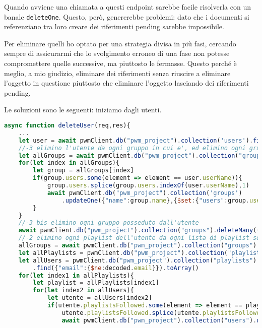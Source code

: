 Quando avviene una chiamata a questi endpoint sarebbe facile risolverla con un banale \verb|deleteOne|. Questo, però, genererebbe problemi: dato che i documenti si referenziano tra loro creare dei riferimenti pending sarebbe impossibile.

Per eliminare quelli ho optato per una strategia divisa in più fasi, cercando sempre di assicurarmi che lo svolgimento erroneo di una fase non potesse compromettere quelle successive, ma piuttosto le fermasse. Questo perché è meglio, a mio giudizio, eliminare dei riferimenti senza riuscire a eliminare l'oggetto in questione piuttosto che eliminare l'oggetto lasciando dei riferimenti pending.

Le soluzioni sono le seguenti: iniziamo dagli utenti.
\begin{lstlisting}[language=JavaScript]
async function deleteUser(req,res){ 
    ...
    let user = await pwmClient.db("pwm_project").collection('users').findOne({"email": decoded.email})
    //-3 elimino l'utente da ogni gruppo in cui e', ed elimino ogni gruppo che sia owned, rimuovendolo prima da ogni utente che sia in quel gruppo
    let allGroups = await pwmClient.db("pwm_project").collection("groups").find({}).toArray()
    for(let index in allGroups){
        let group = allGroups[index]
        if(group.users.some(element => element == user.userName)){
            group.users.splice(group.users.indexOf(user.userName),1)
            await pwmClient.db("pwm_project").collection('groups')
                .updateOne({"name":group.name},{$set:{"users":group.users}})
        }
    }
    //-3 bis elimino ogni gruppo posseduto dall'utente
    await pwmClient.db("pwm_project").collection("groups").deleteMany({"owner":user.userName})
    //-2 elimino ogni playlist dell'utente da ogni lista di playlist seguite altrui
    allGroups = await pwmClient.db("pwm_project").collection("groups").find({}).toArray()
    let allPlaylists = pwmClient.db("pwm_project").collection("playlists").find({"owner":user.userName}).toArray()
    let allUsers = pwmClient.db("pwm_project").collection("playlists")
        .find({"email":{$ne:decoded.email}}).toArray()
    for(let index1 in allPlaylists){
        let playlist = allPlaylists[index1]
        for(let index2 in allUsers){
            let utente = allUsers[index2]
            if(utente.playlistsFollowed.some(element => element == playlist.name)){
                utente.playlistsFollowed.splice(utente.playlistsFollowed.indexOf(playlist.name),1)
                await pwmClient.db("pwm_project").collection("users").updateOne({"email":utente.email},

\end{lstlisting}
